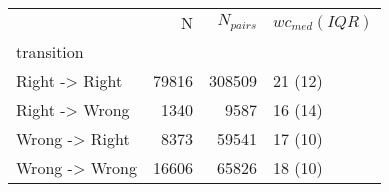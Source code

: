 \begin{tabular}{lrrl}
	\toprule
	{} &      N &  $N_{pairs}$ & $wc_{med}(IQR)$ \\
	transition     &        &          &           \\
	\midrule
	Right -> Right &  79816 &   308509 &   21 (12) \\
	Right -> Wrong &   1340 &     9587 &   16 (14) \\
	Wrong -> Right &   8373 &    59541 &   17 (10) \\
	Wrong -> Wrong &  16606 &    65826 &   18 (10) \\
	\bottomrule
\end{tabular}
